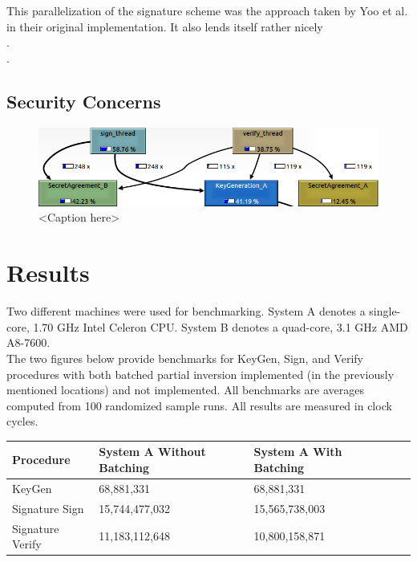 This parallelization of the signature scheme was the approach taken by Yoo et al. in their original implementation. It also lends itself rather nicely\\

\noindent
{}.\\

\noindent
{}.\\

\subsection{Security Concerns}

\begin{figure}[htb]
\centering
\includegraphics[scale=0.5]{signandverifycall} %
\caption{<Caption here>}
\label{fig:label} %
\end{figure}

\section{Results}

Two different machines were used for benchmarking. System A denotes a single-core, 1.70 GHz Intel Celeron CPU. System B denotes a quad-core, 3.1 GHz AMD A8-7600.\\

The two figures below provide benchmarks for KeyGen, Sign, and Verify procedures with both batched partial inversion implemented (in the previously mentioned locations) and not implemented. All benchmarks are averages computed from 100 randomized sample runs. All results are measured in clock cycles.

\begin{center}
\begin{tabular}{@{}lllll@{}}
	\toprule
	Procedure & System A Without Batching & System A With Batching\\
	\midrule
	KeyGen & 68,881,331 & 68,881,331\\
	Signature Sign & 15,744,477,032 & 15,565,738,003\\
	Signature Verify & 11,183,112,648 & 10,800,158,871\\
	\bottomrule
\end{tabular}
\end{center}

